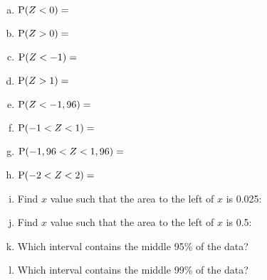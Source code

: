 \begin{enumerate}[a)]
\item $\P(Z < 0) =$ %
	\hrulefill
\item $\P(Z > 0) =$ %
	\hrulefill
\item $\P(Z < -1) =$ %
	\hrulefill
\item $\P(Z > 1) =$ %
	\hrulefill
\item $\P(Z < -1,96) = 	$ \hrulefill
\item $\P(-1 < Z < 1) =$ \hrulefill
\item $\P(-1,96 < Z < 1,96) =$ \hrulefill
\item $\P(-2 < Z < 2) = $ \hrulefill
\item Find $x$ value such that the area to the left of $x$ is 0.025: \hrulefill
\item Find $x$ value such that the area to the left of $x$ is 0.5: \hrulefill
\item Which interval contains the middle 95\% of the data? \hrulefill
\item Which interval contains the middle 99\% of the data? \hrulefill
\end{enumerate}


